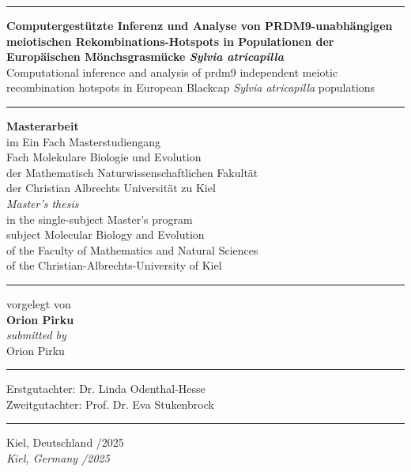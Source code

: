 \documentclass[12pt,a4paper]{article}
\begin{document}
\begin{center}
	\hrule
	\vspace{0.5cm}

	{\Large \textbf{
			Computergestützte Inferenz und Analyse von PRDM9-unabhängigen meiotischen
			Rekombinations-Hotspots in Populationen der Europäischen Mönchsgrasmücke
			\textit{Sylvia atricapilla}}}\\[0.5cm]

	{\large Computational inference and analysis of prdm9 independent meiotic
	recombination hotspots in European Blackcap \textit{Sylvia atricapilla} populations}\\[0.5cm]

	\hrule
	\vspace{0.5cm}

	\textbf{Masterarbeit}\\[2pt]
	im Ein Fach Masterstudiengang\\
	Fach Molekulare Biologie und Evolution\\
	der Mathematisch Naturwissenschaftlichen Fakultät\\
	der Christian Albrechts Universität zu Kiel\\[0.5cm]

	\textit{Master's thesis}\\[2pt]
	in the single-subject Master's program\\
	subject Molecular Biology and Evolution\\
	of the Faculty of Mathematics and Natural Sciences\\
	of the Christian-Albrechts-University of Kiel\\[0.5cm]
	\hrule
	\vspace{0.5cm}
	vorgelegt von\\
	\textbf{Orion Pirku}\\[6pt]
	\textit{submitted by}\\
	Orion Pirku\\[0.5cm]

	\hrule
	\vspace{0.5cm}
	Erstgutachter: Dr. Linda Odenthal-Hesse\\
	Zweitgutachter: Prof. Dr. Eva Stukenbrock\\[0.5cm]

	\hrule
	\vspace{0.5cm}
	Kiel, Deutschland /2025\\
	\textit{Kiel, Germany /2025}

\end{center}
\newpage
\tableofcontents
\newpage
\end{document}
